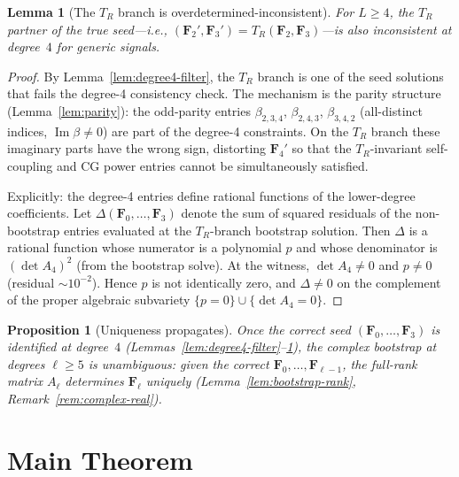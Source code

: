 \documentclass[11pt]{article}
\newtheorem{lemma}[theorem]{Lemma}
\newtheorem{proposition}[theorem]{Proposition}
\DeclareMathOperator{\im}{Im}
\begin{document}
\begin{lemma}[The $T_R$ branch is overdetermined-inconsistent]
\label{lem:TR-resolve}
For $L \ge 4$, the $T_R$ partner of the true seed---i.e.,
$(\mathbf{F}_2', \mathbf{F}_3') = T_R(\mathbf{F}_2, \mathbf{F}_3)$---is
also inconsistent at degree~$4$ for generic signals.
\end{lemma}
\begin{proof}
By Lemma~\ref{lem:degree4-filter}, the $T_R$ branch is one of the
seed solutions that fails the degree-4 consistency check.
The mechanism is the parity structure (Lemma~\ref{lem:parity}):
the odd-parity entries $\beta_{2,3,4}$, $\beta_{2,4,3}$, $\beta_{3,4,2}$
(all-distinct indices, $\im\beta \ne 0$) are part of the degree-4
constraints.  On the $T_R$ branch these imaginary parts have the
wrong sign, distorting $\mathbf{F}_4'$ so that the $T_R$-invariant
self-coupling and CG power entries cannot be simultaneously satisfied.

Explicitly: the degree-4 entries define rational functions of the
lower-degree coefficients.  Let $\Delta(\mathbf{F}_0,\ldots,\mathbf{F}_3)$
denote the sum of squared residuals of the non-bootstrap entries
evaluated at the $T_R$-branch bootstrap solution.
Then $\Delta$ is a rational function whose numerator is a polynomial $p$
and whose denominator is $(\det A_4)^2$ (from the bootstrap solve).
At the witness, $\det A_4 \ne 0$ and $p \ne 0$
(residual ${\sim}10^{-2}$).
Hence $p$ is not identically zero, and $\Delta \ne 0$ on the complement
of the proper algebraic subvariety $\{p = 0\} \cup \{\det A_4 = 0\}$.
\end{proof}

\begin{proposition}[Uniqueness propagates]\label{prop:TR-propagate}
Once the correct seed $(\mathbf{F}_0, \ldots, \mathbf{F}_3)$ is identified
at degree~$4$ (Lemmas~\ref{lem:degree4-filter}--\ref{lem:TR-resolve}),
the complex bootstrap at degrees $\ell \ge 5$ is unambiguous:
given the correct $\mathbf{F}_0, \ldots, \mathbf{F}_{\ell-1}$, the
full-rank matrix $A_\ell$ determines $\mathbf{F}_\ell$ uniquely
(Lemma~\ref{lem:bootstrap-rank}, Remark~\ref{rem:complex-real}).
\end{proposition}


\section{Main Theorem}
\end{document}
